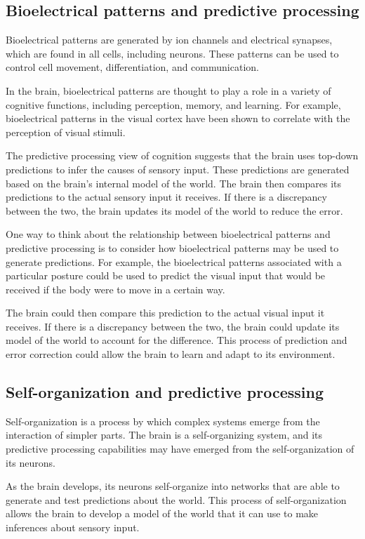 \subsection{Bioelectrical patterns and predictive processing}

Bioelectrical patterns are generated by ion channels and electrical synapses, which are found in all cells, including neurons. These patterns can be used to control cell movement, differentiation, and communication.

In the brain, bioelectrical patterns are thought to play a role in a variety of cognitive functions, including perception, memory, and learning. For example, bioelectrical patterns in the visual cortex have been shown to correlate with the perception of visual stimuli.

The predictive processing view of cognition suggests that the brain uses top-down predictions to infer the causes of sensory input. These predictions are generated based on the brain's internal model of the world. The brain then compares its predictions to the actual sensory input it receives. If there is a discrepancy between the two, the brain updates its model of the world to reduce the error.

One way to think about the relationship between bioelectrical patterns and predictive processing is to consider how bioelectrical patterns may be used to generate predictions. For example, the bioelectrical patterns associated with a particular posture could be used to predict the visual input that would be received if the body were to move in a certain way.

The brain could then compare this prediction to the actual visual input it receives. If there is a discrepancy between the two, the brain could update its model of the world to account for the difference. This process of prediction and error correction could allow the brain to learn and adapt to its environment.

\subsection{Self-organization and predictive processing}
Self-organization is a process by which complex systems emerge from the interaction of simpler parts. The brain is a self-organizing system, and its predictive processing capabilities may have emerged from the self-organization of its neurons.

As the brain develops, its neurons self-organize into networks that are able to generate and test predictions about the world. This process of self-organization allows the brain to develop a model of the world that it can use to make inferences about sensory input.

